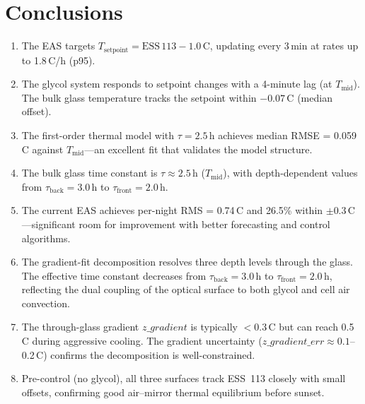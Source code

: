 \documentclass[11pt]{article}
\begin{document}
\section{Conclusions}

\begin{enumerate}
  \item The EAS targets $T_\mathrm{setpoint} = \mathrm{ESS\,113} -
    1.0$\,\textdegree C, updating every 3\,min at rates up to
    1.8\,\textdegree C/h (p95).

  \item The glycol system responds to setpoint changes with a
    4-minute lag (at $T_\mathrm{mid}$).  The bulk glass temperature
    tracks the setpoint within $-0.07$\,\textdegree C (median offset).

  \item The first-order thermal model with $\tau = 2.5$\,h
    achieves median RMSE = 0.059\,\textdegree C against
    $T_\mathrm{mid}$---an excellent fit that validates the model
    structure.

  \item The bulk glass time constant is $\tau \approx 2.5$\,h
    ($T_\mathrm{mid}$), with depth-dependent values from
    $\tau_\mathrm{back} = 3.0$\,h to $\tau_\mathrm{front} = 2.0$\,h.

  \item The current EAS achieves per-night RMS = 0.74\,\textdegree C
    and 26.5\% within $\pm$0.3\,\textdegree C---significant room for
    improvement with better forecasting and control algorithms.

  \item The gradient-fit decomposition resolves three depth levels
    through the glass.  The effective time constant decreases from
    $\tau_\mathrm{back} = 3.0$\,h to $\tau_\mathrm{front} = 2.0$\,h,
    reflecting the dual coupling of the optical surface to both glycol
    and cell air convection.

  \item The through-glass gradient $z\_gradient$ is typically
    $< 0.3$\,\textdegree C but can reach 0.5\,\textdegree C during
    aggressive cooling.  The gradient uncertainty
    ($z\_gradient\_err \approx 0.1$--0.2\,\textdegree C) confirms
    the decomposition is well-constrained.

  \item Pre-control (no glycol), all three surfaces track ESS~113
    closely with small offsets, confirming good air--mirror thermal
    equilibrium before sunset.


\end{enumerate}
\end{document}
